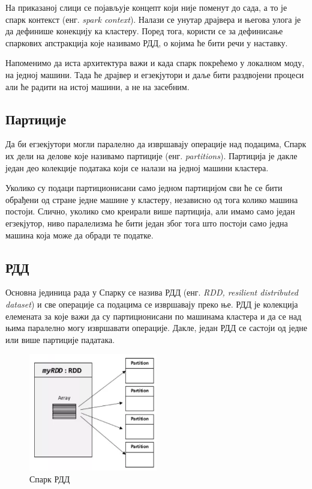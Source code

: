 \documentclass[12pt,oneside]{memoir}
\begin{document}
На приказаној слици се појављује концепт који није поменут до сада, а то је спарк контекст (енг. \textit{spark context}). Налази се унутар драјвера и његова улога је да дефинише конекцију ка кластеру. Поред тога, користи се за дефинисање спаркових апстракција које називамо РДД, о којима ће бити речи у наставку. 

Напоменимо да иста архитектура важи и када спарк покрећемо у локалном моду, на једној машини. Тада ће драјвер и егзекјутори и даље бити раздвојени процеси али ће радити на истој машини, а не на засебним. \cite{spark_guide}

\subsection{Партиције}
\label{subsec:spark_partic}

Да би егзекјутори могли паралелно да извршавају операције над подацима, Спарк их дели на делове које називамо партиције (енг. \textit{partitions}). Партиција је дакле један део колекције података који се налази на једној машини кластера. \cite{spark_guide}

Уколико су подаци партиционисани само једном партицијом сви ће се бити обрађени од стране једне машине у кластеру, независно од тога колико машина постоји. Слично, уколико смо креирали више партиција, али имамо само један егзекјутор, ниво паралелизма ће бити један због тога што постоји само једна машина која може да обради те податке. \cite{spark_guide}

\subsection{РДД}
\label{subsec:spark_rdd}

Основна јединица рада у Спарку се назива РДД (енг. \textit{RDD, resilient distributed dataset}) и све операције са подацима се извршавају преко ње. РДД је колекција елемената за које важи да су партиционисани по машинама кластера и да се над њима паралелно могу извршавати операције. \cite{spark_rdd} Дакле, један РДД се састоји од једне или више партиције падатака. \cite{spark_guide}

\begin{figure}[!ht]
  \centering
  \includegraphics[width=0.5\textwidth]{pictures/spark_rdd.png}
  \caption{Спарк РДД}
  \label{fig:sprk_rdd}
\end{figure}
\end{document}
